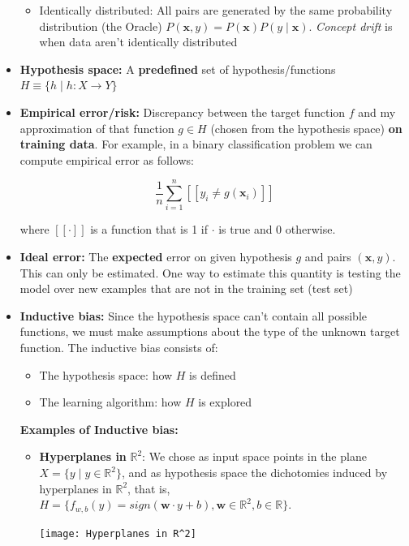 \begin{itemize}
\begin{itemize}
    \item Identically distributed: All pairs are generated by the same probability distribution (the Oracle) $P(\textbf{x},y) = P(\textbf{x})P(y\mid \textbf{x})$. \textit{Concept drift} is when data aren't identically distributed
\end{itemize}
\item \textbf{Hypothesis space:}
A \textbf{predefined} set of hypothesis/functions $H \equiv \{h\mid h:X \rightarrow Y\}$

\item \textbf{Empirical error/risk:}
Discrepancy between the target function $f$ and my approximation of that function $g \in H$ (chosen from the hypothesis space) \textbf{on training data}. For example, in a binary classification problem we can compute empirical error as follows:
\begin{center}
    \[\frac{1}{n}\sum_{i=1}^{n} [\![y_{i}\neq g(\textbf{x}_{i})]\!]\]
\end{center}
where $[\![\cdot]\!]$ is a function that is 1 if $\cdot$ is true and 0 otherwise.

\item \textbf{Ideal error:}
The \textbf{expected} error on given hypothesis $g$ and pairs $(\textbf{x},y)$. This can only be estimated. One way to estimate this quantity is testing the model over new examples that are not in the training set (test set) 

\item \textbf{Inductive bias:}
Since the hypothesis space can't contain all possible functions, we must make assumptions about the type of the unknown target function. The inductive bias consists of:
\begin{itemize}
    \item The hypothesis space: how $H$ is defined
    \item The learning algorithm: how $H$ is explored
\end{itemize}
\textbf{Examples of Inductive bias:}
\begin{itemize}
    \item \textbf{Hyperplanes in} $\mathbb{R}^{2}$: We chose as input space points in the plane $X = \{y\mid y \in \mathbb{R}^{2}\}$, and as hypothesis space the dichotomies induced by hyperplanes in $\mathbb{R}^{2}$, that is, $H = \{f_{w,b}(y) = sign(\textbf{w} \cdot y + b), \textbf{w} \in \mathbb{R}^{2}, b \in\mathbb{R}\}$.
    \begin{center}
        \texttt{[image: Hyperplanes in R^2]}
    \end{center}


\end{itemize}
\end{itemize}
